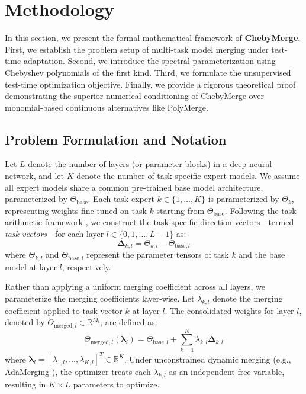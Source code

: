 \section{Methodology}
\label{sec:method}

In this section, we present the formal mathematical framework of \textbf{ChebyMerge}. First, we establish the problem setup of multi-task model merging under test-time adaptation. Second, we introduce the spectral parameterization using Chebyshev polynomials of the first kind. Third, we formulate the unsupervised test-time optimization objective. Finally, we provide a rigorous theoretical proof demonstrating the superior numerical conditioning of ChebyMerge over monomial-based continuous alternatives like PolyMerge.

\subsection{Problem Formulation and Notation}
Let $L$ denote the number of layers (or parameter blocks) in a deep neural network, and let $K$ denote the number of task-specific expert models. We assume all expert models share a common pre-trained base model architecture, parameterized by $\Theta_{\text{base}}$. Each task expert $k \in \{1, \dots, K\}$ is parameterized by $\Theta_k$, representing weights fine-tuned on task $k$ starting from $\Theta_{\text{base}}$. Following the task arithmetic framework \cite{ilharco2022editing}, we construct the task-specific direction vectors---termed \emph{task vectors}---for each layer $l \in \{0, 1, \dots, L-1\}$ as:
\begin{equation}
\mathbf{\Delta}_{k, l} = \Theta_{k, l} - \Theta_{\text{base}, l}
\end{equation}
where $\Theta_{k, l}$ and $\Theta_{\text{base}, l}$ represent the parameter tensors of task $k$ and the base model at layer $l$, respectively. 

Rather than applying a uniform merging coefficient across all layers, we parameterize the merging coefficients layer-wise. Let $\lambda_{k, l}$ denote the merging coefficient applied to task vector $k$ at layer $l$. The consolidated weights for layer $l$, denoted by $\Theta_{\text{merged}, l} \in \mathbb{R}^{M_l}$, are defined as:
\begin{equation}
\Theta_{\text{merged}, l}(\boldsymbol{\lambda}_l) = \Theta_{\text{base}, l} + \sum_{k=1}^K \lambda_{k, l} \mathbf{\Delta}_{k, l}
\end{equation}
where $\boldsymbol{\lambda}_l = [\lambda_{1, l}, \dots, \lambda_{K, l}]^T \in \mathbb{R}^K$. Under unconstrained dynamic merging (e.g., AdaMerging \cite{lu2023adamerging}), the optimizer treats each $\lambda_{k, l}$ as an independent free variable, resulting in $K \times L$ parameters to optimize.

